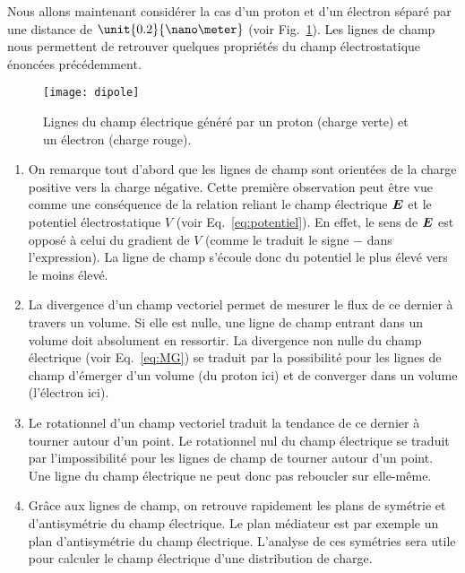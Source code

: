 Nous allons maintenant considérer la cas d'un proton et d'un électron séparé 
par une distance de $\unit{0.2}{\nano \meter}$ (voir Fig.~\ref{fig:dipole}).
Les lignes de champ nous permettent de retrouver quelques propriétés du champ 
électrostatique énoncées précédemment.

\begin{figure}[h!]
	\centering
	\texttt{[image: dipole]}
	\caption{Lignes du champ électrique généré par un proton (charge verte) et 
	         un électron (charge rouge).}%
	\label{fig:dipole}
\end{figure}

\begin{enumerate}
	\item On remarque tout d'abord que les lignes de champ sont orientées 
	  de la charge positive vers la charge négative. Cette première 
	  observation peut être vue comme une conséquence de la relation reliant 
	  le champ électrique $\vece$ et le potentiel électrostatique $V$ 
	  (voir Eq.~\ref{eq:potentiel}). En effet, le sens de $\vece$ est 
	  opposé à celui du gradient de $V$ (comme le traduit le signe $-$ dans 
	  l'expression).
	  La ligne de champ s'écoule donc du potentiel le plus élevé 
	  vers le moins élevé.
      \item La divergence d'un champ vectoriel permet de mesurer
	    le flux de ce dernier à travers un volume. Si elle est nulle, 
	    une ligne de champ entrant dans un volume doit absolument en ressortir.
	    La divergence non nulle du champ électrique (voir Eq.~\ref{eq:MG})
	    se traduit par la possibilité pour les lignes de champ d'émerger d'un 
	    volume (du proton ici) et de converger dans un volume (l'électron ici).

	    \item Le rotationnel d'un champ vectoriel traduit la tendance de ce dernier
	    à tourner autour d'un point.
	    Le rotationnel nul du champ électrique se traduit par l'impossibilité
	    pour les lignes de champ de tourner autour d'un point. Une ligne du champ
	    électrique ne peut donc pas reboucler sur elle-même.

    	   \item Grâce aux lignes de champ, on retrouve rapidement les plans de 
		 symétrie et d'antisymétrie du champ électrique. Le plan médiateur 
		 est par exemple un plan d'antisymétrie du champ électrique. 
		 L'analyse de ces symétries sera utile pour calculer le champ
		 électrique d'une distribution de charge.
\end{enumerate}

